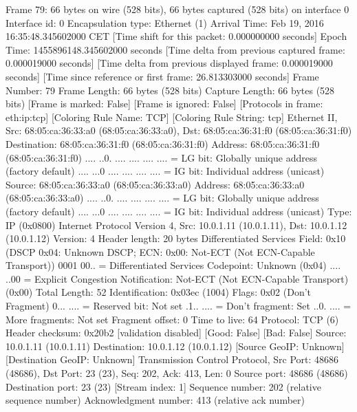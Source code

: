 Frame 79: 66 bytes on wire (528 bits), 66 bytes captured (528 bits) on interface 0
    Interface id: 0
    Encapsulation type: Ethernet (1)
    Arrival Time: Feb 19, 2016 16:35:48.345602000 CET
    [Time shift for this packet: 0.000000000 seconds]
    Epoch Time: 1455896148.345602000 seconds
    [Time delta from previous captured frame: 0.000019000 seconds]
    [Time delta from previous displayed frame: 0.000019000 seconds]
    [Time since reference or first frame: 26.813303000 seconds]
    Frame Number: 79
    Frame Length: 66 bytes (528 bits)
    Capture Length: 66 bytes (528 bits)
    [Frame is marked: False]
    [Frame is ignored: False]
    [Protocols in frame: eth:ip:tcp]
    [Coloring Rule Name: TCP]
    [Coloring Rule String: tcp]
Ethernet II, Src: 68:05:ca:36:33:a0 (68:05:ca:36:33:a0), Dst: 68:05:ca:36:31:f0 (68:05:ca:36:31:f0)
    Destination: 68:05:ca:36:31:f0 (68:05:ca:36:31:f0)
        Address: 68:05:ca:36:31:f0 (68:05:ca:36:31:f0)
        .... ..0. .... .... .... .... = LG bit: Globally unique address (factory default)
        .... ...0 .... .... .... .... = IG bit: Individual address (unicast)
    Source: 68:05:ca:36:33:a0 (68:05:ca:36:33:a0)
        Address: 68:05:ca:36:33:a0 (68:05:ca:36:33:a0)
        .... ..0. .... .... .... .... = LG bit: Globally unique address (factory default)
        .... ...0 .... .... .... .... = IG bit: Individual address (unicast)
    Type: IP (0x0800)
Internet Protocol Version 4, Src: 10.0.1.11 (10.0.1.11), Dst: 10.0.1.12 (10.0.1.12)
    Version: 4
    Header length: 20 bytes
    Differentiated Services Field: 0x10 (DSCP 0x04: Unknown DSCP; ECN: 0x00: Not-ECT (Not ECN-Capable Transport))
        0001 00.. = Differentiated Services Codepoint: Unknown (0x04)
        .... ..00 = Explicit Congestion Notification: Not-ECT (Not ECN-Capable Transport) (0x00)
    Total Length: 52
    Identification: 0x03ec (1004)
    Flags: 0x02 (Don't Fragment)
        0... .... = Reserved bit: Not set
        .1.. .... = Don't fragment: Set
        ..0. .... = More fragments: Not set
    Fragment offset: 0
    Time to live: 64
    Protocol: TCP (6)
    Header checksum: 0x20b2 [validation disabled]
        [Good: False]
        [Bad: False]
    Source: 10.0.1.11 (10.0.1.11)
    Destination: 10.0.1.12 (10.0.1.12)
    [Source GeoIP: Unknown]
    [Destination GeoIP: Unknown]
Transmission Control Protocol, Src Port: 48686 (48686), Dst Port: 23 (23), Seq: 202, Ack: 413, Len: 0
    Source port: 48686 (48686)
    Destination port: 23 (23)
    [Stream index: 1]
    Sequence number: 202    (relative sequence number)
    Acknowledgment number: 413    (relative ack number)
